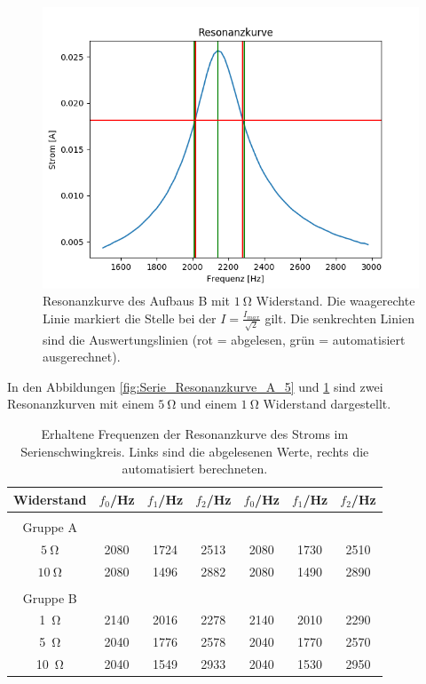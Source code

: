 \documentclass[12pt,a4paper]{article}
\begin{document}
\begin{figure}
	\centering
	\includegraphics[scale=0.8]{Bilder/Serie_Resonanzkurve_B_1.png}
	\caption{Resonanzkurve des Aufbaus B mit $\SI{1}{\ohm}$ Widerstand. Die waagerechte Linie markiert die Stelle bei der $I = \frac{I_{max}}{\sqrt{2}}$ gilt. Die senkrechten Linien sind die Auswertungslinien (rot = abgelesen, grün = automatisiert ausgerechnet).}
	\label{fig:Serie_Resonanzkurve_B_1}
\end{figure}




In den Abbildungen \ref{fig:Serie_Resonanzkurve_A_5} und \ref{fig:Serie_Resonanzkurve_B_1} sind zwei Resonanzkurven mit einem $\SI{5}{\ohm}$ und einem $\SI{1}{\ohm}$ Widerstand dargestellt. \\


\begin{table}
	\centering
	\begin{tabular}{|c|c|c|c||c|c|c|}
		\hline
		Widerstand & $f_0$/Hz & $f_1$/Hz & $f_2$/Hz & $f_0$/Hz & $f_1$/Hz & $f_2$/Hz \\
		\hline
		&&&&&&\\
		Gruppe A &&&&&&\\
		\hline
		$\SI{5}{\ohm}$ & 2080 & 1724 & 2513 & 2080 & 1730 & 2510 \\
		\hline
		$\SI{10}{\ohm}$ & 2080 & 1496 & 2882 & 2080 & 1490 & 2890 \\
		\hline
		&&&&&&\\
		Gruppe B &&&&&&\\
		\hline
		\SI{1}{\ohm} & 2140 & 2016 & 2278 & 2140 & 2010 & 2290 \\
		\hline
		\SI{5}{\ohm} & 2040 & 1776 & 2578 & 2040 & 1770 & 2570 \\
		\hline
		\SI{10}{\ohm} & 2040 & 1549 & 2933 & 2040 & 1530 & 2950 \\
		\hline
	\end{tabular}
	\caption{Erhaltene Frequenzen der Resonanzkurve des Stroms im Serienschwingkreis. Links sind die abgelesenen Werte, rechts die automatisiert berechneten.}
	\label{tab:StromResonanz}
\end{table}
\end{document}
